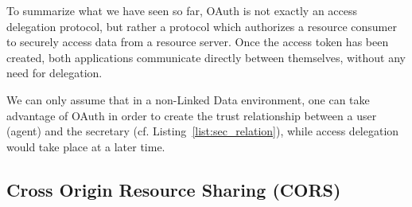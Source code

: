 \documentclass[a4paper]{llncs}
\begin{document}
To summarize what we have seen so far, OAuth is not exactly an access delegation protocol, but rather a protocol which authorizes a resource consumer to securely access data from a resource server. Once the access token has been created, both applications communicate directly between themselves, without any need for delegation.

We can only assume that in a non-Linked Data environment, one can take advantage of OAuth in order to create the trust relationship between a user (agent) and the secretary (cf. Listing~\ref{list:sec_relation}), while access delegation would take place at a later time.



\subsection{Cross Origin Resource Sharing (CORS)}





\end{document}
